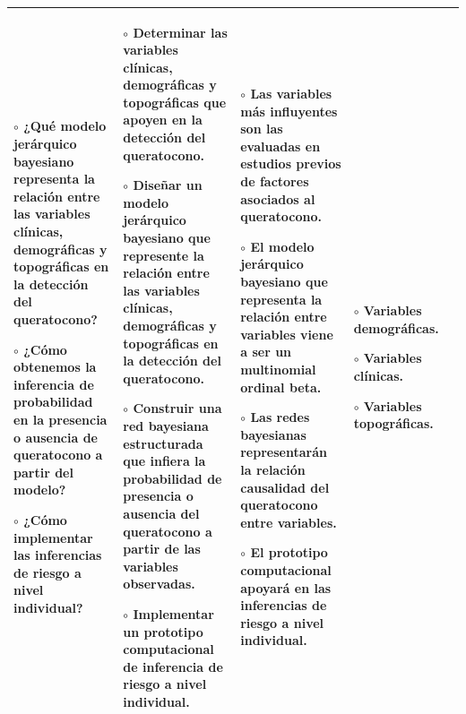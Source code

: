 \begin{landscape}
\begin{table}[h!]
\begin{tabular}{|p{4.2cm}|p{4.5cm}|p{4.5cm}|p{3cm}|p{4.2cm}|}
{    $\circ$ ¿Qué modelo jerárquico bayesiano representa la relación entre las variables clínicas, demográficas y topográficas en la detección del queratocono?\vspace{0.2cm}

    $\circ$ ¿Cómo obtenemos la inferencia de probabilidad en la presencia o ausencia de queratocono a partir del modelo?\vspace{0.2cm}

    $\circ$ ¿Cómo implementar las inferencias de riesgo a nivel individual?} & \multicolumn{1}{p{4.5cm}|}{
    $\circ$ Determinar las variables clínicas, demográficas y topográficas que apoyen en la detección del queratocono.\vspace{0.2cm}

    $\circ$ Diseñar un modelo jerárquico bayesiano que represente la relación entre las variables clínicas, demográficas y topográficas en la detección del queratocono.\vspace{0.2cm}

    $\circ$ Construir una red bayesiana estructurada que infiera la probabilidad de presencia o ausencia del queratocono a partir de las variables observadas.\vspace{0.2cm}

    $\circ$ Implementar un prototipo computacional de inferencia de riesgo a nivel individual.

    } & \multicolumn{1}{p{4.5cm}|}{
    $\circ$ Las variables más influyentes son las evaluadas en estudios previos de factores asociados al queratocono.\vspace{0.2cm}

    $\circ$ El modelo jerárquico bayesiano que representa la relación entre variables viene a ser un multinomial ordinal beta.\vspace{0.2cm}

    $\circ$ Las redes bayesianas representarán la relación causalidad del queratocono entre variables.\vspace{0.2cm}

    $\circ$ El prototipo computacional apoyará en las inferencias de riesgo a nivel individual.\vspace{0.2cm}

    } & \multicolumn{1}{p{3cm}|}{
    \vspace{0.2cm}
    $\circ$ Variables demográficas.\vspace{0.2cm}

    $\circ$ Variables clínicas.\vspace{0.2cm}

    $\circ$ Variables topográficas.
    }  & \\ \hline
\end{tabular}
\end{table}

\end{landscape}

